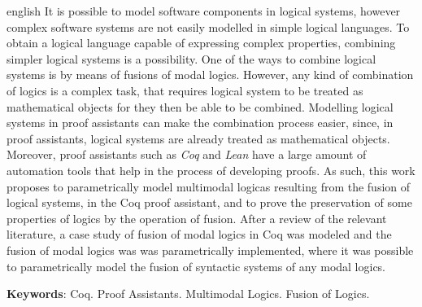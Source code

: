 
\begin{resumo}[Abstract]
 \begin{otherlanguage*}{english}
	It is possible to model software components in logical systems, however complex software systems are not easily modelled in simple logical languages.
	To obtain a logical language capable of expressing complex properties, combining simpler logical systems is a possibility.
	One of the ways to combine logical systems is by means of fusions of modal logics. However, any kind of combination of logics is a complex task, that
	requires logical system to be treated as mathematical objects for they then be able to be combined. Modelling logical systems in proof assistants can
	make the combination process easier, since, in proof assistants, logical systems are already treated as mathematical objects. Moreover,
	proof assistants such as \textit{Coq} and \textit{Lean} have a large amount of automation tools that help in the process of developing proofs.
	As such, this work proposes to parametrically model multimodal logicas resulting from the fusion of logical systems, in the Coq proof assistant,
	and to prove the preservation of some properties of logics by the operation of fusion.
	After a review of the relevant literature, a case study of fusion of modal logics in Coq was modeled and the fusion of modal logics was  was
	parametrically implemented, where it was possible to parametrically model the fusion of syntactic systems of any modal logics.

   \textbf{Keywords}: Coq. Proof Assistants. Multimodal Logics. Fusion of Logics.
 \end{otherlanguage*}
\end{resumo}

